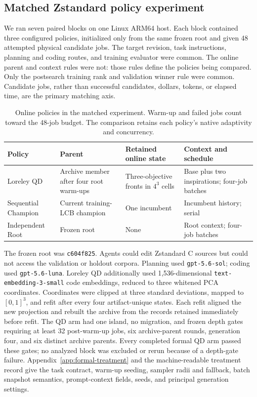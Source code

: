 \documentclass[10pt,twocolumn]{article}
\newcommand{\code}[1]{\texttt{#1}}
\begin{document}
\subsection{Matched Zstandard policy experiment}
\label{sec:matched-design}

We ran seven paired blocks on one Linux ARM64 host. Each block contained three
configured policies, initialized only from the same frozen root and given 48
attempted physical candidate jobs. The target revision, task instructions,
planning and coding routes, and training evaluator were common. The online
parent and context rules were not: those rules define the policies being
compared. Only the postsearch training rank and validation winner rule were
common. Candidate jobs, rather than successful candidates, dollars, tokens, or
elapsed time, are the primary matching axis.

\begin{table}[t]
  \centering
  \caption{Online policies in the matched experiment. Warm-up and failed jobs
  count toward the 48-job budget. The comparison retains each policy's native
  adaptivity and concurrency.}
  \label{tab:formal-policies}
  \begin{tabularx}{\textwidth}{@{}P{0.19\textwidth}P{0.25\textwidth}P{0.28\textwidth}Y@{}}
    \toprule
    Policy & Parent & Retained online state & Context and schedule \\
    \midrule
    Loreley QD & Archive member after four root warm-ups & Three-objective fronts in $4^3$ cells & Base plus two inspirations; four-job batches \\
    Sequential Champion & Current training-LCB champion & One incumbent & Incumbent history; serial \\
    Independent Root & Frozen root & None & Root context; four-job batches \\
    \bottomrule
  \end{tabularx}
\end{table}

The frozen root was \code{c604f825}. Agents could edit Zstandard C sources but
could not access the validation or holdout corpora. Planning used
\code{gpt-5.6-sol}; coding used \code{gpt-5.6-luna}. Loreley QD additionally
used 1,536-dimensional \code{text-embedding-3-small} code embeddings, reduced
to three whitened PCA coordinates. Coordinates were clipped at three standard
deviations, mapped to $[0,1]^3$, and refit after every four artifact-unique
states. Each refit aligned the new projection and rebuilt the archive from the
records retained immediately before refit. The QD arm had one island, no
migration, and frozen depth gates requiring at least 32 post-warm-up jobs, six
archive-parent rounds, generation four, and six distinct archive parents.
Every completed formal QD arm passed these gates; no analyzed block was
excluded or rerun because of a depth-gate failure. Appendix~\ref{app:formal-treatment}
and the machine-readable treatment record give the task contract, warm-up
seeding, sampler radii and fallback, batch snapshot semantics, prompt-context
fields, seeds, and principal generation settings.
\end{document}
